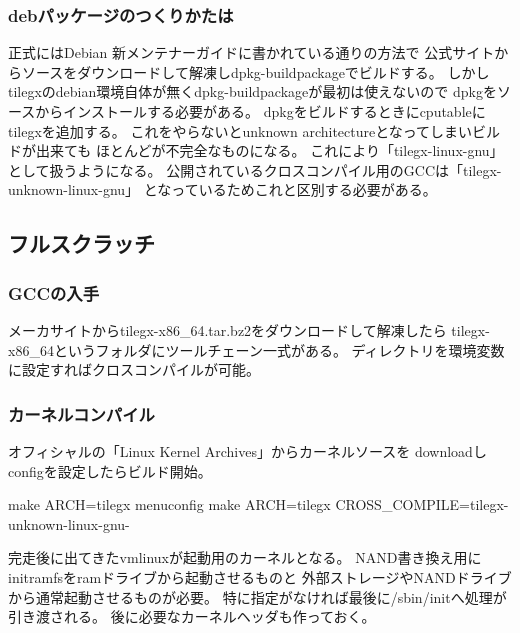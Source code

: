 \documentclass[mingoth,a4paper]{jsarticle}
\begin{document}
\subsubsection{debパッケージのつくりかたは}
正式にはDebian 新メンテナーガイドに書かれている通りの方法で
公式サイトからソースをダウンロードして解凍しdpkg-buildpackageでビルドする。
しかしtilegxのdebian環境自体が無くdpkg-buildpackageが最初は使えないので
dpkgをソースからインストールする必要がある。
dpkgをビルドするときにcputableにtilegxを追加する。
これをやらないとunknown architectureとなってしまいビルドが出来ても
ほとんどが不完全なものになる。
これにより「tilegx-linux-gnu」として扱うようになる。
公開されているクロスコンパイル用のGCCは「tilegx-unknown-linux-gnu」
となっているためこれと区別する必要がある。 

\subsection{フルスクラッチ}
\subsubsection{GCCの入手}
メーカサイトからtilegx-x86\_64.tar.bz2をダウンロードして解凍したら
tilegx-x86\_64というフォルダにツールチェーン一式がある。
ディレクトリを環境変数に設定すればクロスコンパイルが可能。

\subsubsection{カーネルコンパイル}
オフィシャルの「Linux Kernel Archives」からカーネルソースを
downloadしconfigを設定したらビルド開始。
\begin{commandline}
make ARCH=tilegx menuconfig
make ARCH=tilegx CROSS_COMPILE=tilegx-unknown-linux-gnu-
\end{commandline}
完走後に出てきたvmlinuxが起動用のカーネルとなる。
NAND書き換え用にinitramfsをramドライブから起動させるものと
外部ストレージやNANDドライブから通常起動させるものが必要。
特に指定がなければ最後に/sbin/initへ処理が引き渡される。
後に必要なカーネルヘッダも作っておく。 
\end{document}
